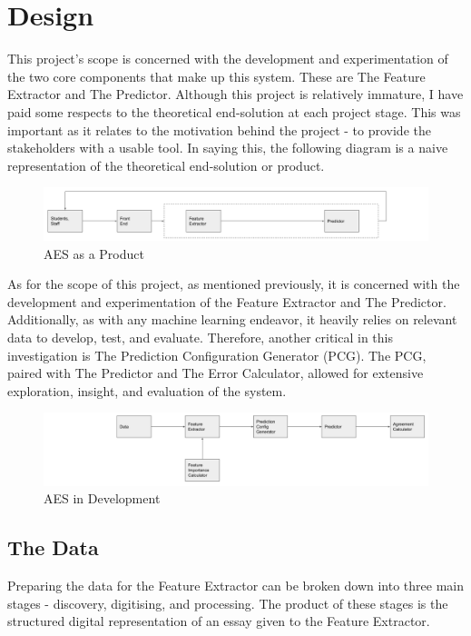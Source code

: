 \chapter{Design}\label{C:des}

This project's scope is concerned with the development and experimentation of the two core components that make up this system. These are The Feature Extractor and The Predictor. Although this project is relatively immature, I have paid some respects to the theoretical end-solution at each project stage. This was important as it relates to the motivation behind the project - to provide the stakeholders with a usable tool. In saying this, the following diagram is a naive representation of the theoretical end-solution or product. 

\begin{figure}[h]
     \centering
     \includegraphics[width=.8\linewidth]{pngs/prod.png}
     \caption{AES as a Product}\label{Fig:Data1}
\end{figure}

As for the scope of this project, as mentioned previously, it is concerned with the development and experimentation of the Feature Extractor and The Predictor. Additionally, as with any machine learning endeavor, it heavily relies on relevant data to develop, test, and evaluate. Therefore, another critical in this investigation is The Prediction Configuration Generator (PCG). The PCG, paired with The Predictor and The Error Calculator, allowed for extensive exploration, insight, and evaluation of the system. 

\begin{figure}[h]
     \centering
     \includegraphics[width=.8\linewidth]{pngs/dev.png}
     \caption{AES in Development}\label{Fig:Data1}
\end{figure}

\section{The Data}
Preparing the data for the Feature Extractor can be broken down into three main stages - discovery, digitising, and processing. The product of these stages is the structured digital representation of an essay given to the Feature Extractor.

